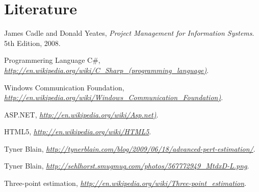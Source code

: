 \section{Literature}
\begin{thebibliography}{9}

  James Cadle and Donald Yeates,
  \emph{Project Management for Information Systems}.
  5th Edition,
  2008.

	Programmering Language C\#, 
  \emph{\url{http://en.wikipedia.org/wiki/C_Sharp_(programming_language)}}.
  
	Windows Communication Foundation, 
  \emph{\url{http://en.wikipedia.org/wiki/Windows_Communication_Foundation)}}.
  
	ASP.NET, 
  \emph{\url{http://en.wikipedia.org/wiki/Asp.net)}}.
  
	HTML5, 
  \emph{\url{http://en.wikipedia.org/wiki/HTML5}}.
  
	Tyner Blain, 
  \emph{\url{http://tynerblain.com/blog/2009/06/18/advanced-pert-estimation/}}.
  
	Tyner Blain, 
  \emph{\url{http://sehlhorst.smugmug.com/photos/567772949_MtdxD-L.png}}.
  
  
	Three-point estimation, 
  \emph{\url{http://en.wikipedia.org/wiki/Three-point_estimation}}.
  
\end{thebibliography}